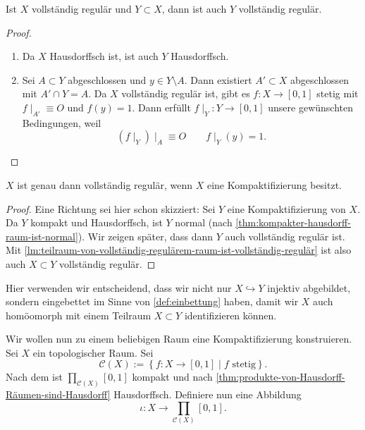 \begin{lemma}\label{lm:teilraum-von-vollständig-regulärem-raum-ist-vollständig-regulär}
    Ist $X$ vollständig regulär und  $Y\subset X$, dann ist auch $Y$ vollständig regulär.
\end{lemma}
\begin{proof}
    \begin{enumerate}[1)]
        \item Da $X$ Hausdorffsch ist, ist auch  $Y$ Hausdorffsch.
        \item Sei  $A\subset Y$ abgeschlossen und $y\in Y \setminus A$. Dann existiert $A'\subset X$ abgeschlossen mit $A' \cap Y = A$. Da $X$ vollständig regulär ist,  gibt es  $f: X \to  [0,1]$ stetig mit $f\mid _{A'} \equiv  O$ und $f(y) = 1$. Dann erfüllt  $f\mid _Y : Y \to  [0,1]$ unsere gewünschten Bedingungen, weil
            \[
                \left(            f\mid _Y \right) \mid _A \equiv O \qquad f\mid _Y(y) = 1
            .\] 
    \end{enumerate}
\end{proof}
\begin{theorem}\label{thm:vollständig-regulär-wenn-kompaktifizierbar}
    $X$ ist genau dann vollständig regulär, wenn  $X$ eine Kompaktifizierung besitzt.
\end{theorem}
\begin{proof}
    Eine Richtung sei hier schon skizziert: Sei $Y$ eine Kompaktifizierung von  $X$. Da $Y$ kompakt und Hausdorffsch, ist  $Y$ normal (nach \autoref{thm:kompakter-hausdorff-raum-ist-normal}). Wir zeigen später, dass dann  $Y$ auch vollständig regulär ist. Mit \autoref{lm:teilraum-von-vollständig-regulärem-raum-ist-vollständig-regulär} ist also auch $X\subset Y$ vollständig regulär.
\end{proof}
\begin{remark*}
    Hier verwenden wir entscheidend, dass wir nicht nur $X\hookrightarrow Y$ injektiv abgebildet, sondern eingebettet im Sinne von \autoref{def:einbettung} haben, damit wir $X$ auch homöomorph mit einem Teilraum $X\subset Y$ identifizieren können.
\end{remark*}
Wir wollen nun zu einem beliebigen Raum eine Kompaktifizierung konstruieren.
Sei $X$ ein topologischer Raum. Sei 
\[
    \mathcal{C}(X) := \left \{f: X \to  [0,1] \mid  f \text{ stetig}\right\} 
.\] 
Nach dem  ist $\prod_{\mathcal{C}(X)}[0,1] $ kompakt und nach \autoref{thm:produkte-von-Hausdorff-Räumen-sind-Hausdorff} Hausdorffsch. Definiere nun eine Abbildung
\[
    ι : X \to  \prod_{\mathcal{C}(X)} [0,1]
.\] 
